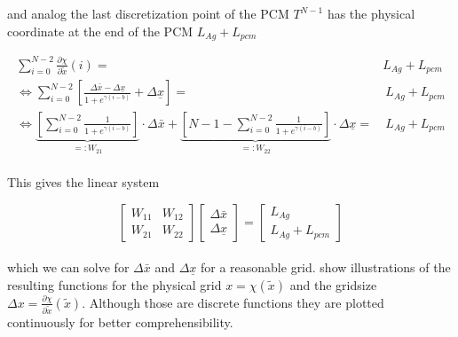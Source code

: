 \documentclass{scrartcl}[12pt, halfparskip]
\numberwithin{equation}{section}
\numberwithin{figure}{section}
\numberwithin{table}{section}
\begin{document}
and analog the last discretization point of the PCM $T^{N-1}$ has the physical coordinate at the end of the PCM $L_{Ag}+L_{pcm}$

\begin{subequations}
	\begin{align}
	\sum_{i=0}^{N - 2} \frac{\partial \chi}{\partial \tilde{x}}(i) = \ & L_{Ag}+L_{pcm} \\
	\Leftrightarrow \sum_{i=0}^{N - 2} \left[ \frac{\Delta \bar{x} - \Delta \underline{x}}{1 + e^{\gamma(i - b)}} + \Delta \underline{x} \right] = & \ L_{Ag}+L_{pcm} \\
	\Leftrightarrow \underbrace{ \left[ \sum_{i=0}^{N - 2} \frac{1}{1 + e^{\gamma(i - b)}} \right] }_{=: W_{21}} \cdot \Delta \bar{x} + \underbrace{ \left[ N - 1 - \sum_{i=0}^{N - 2} \frac{1}{1 + e^{\gamma(i - b)}} \right] }_{=: W_{22}} \cdot \Delta \underline{x} = & \ L_{Ag}+L_{pcm}
	\end{align}
\end{subequations} \\

This gives the linear system

\begin{equation}
	\begin{bmatrix}
		W_{11} & W_{12} \\
		W_{21} & W_{22}
	\end{bmatrix}
	\begin{bmatrix}
		\Delta \bar{x} \\
		\Delta \underline{x}
	\end{bmatrix}
	= 
	\begin{bmatrix}
		L_{Ag} \\
		L_{Ag} + L_{pcm}
	\end{bmatrix}
\end{equation} \\
  
 which we can solve for $\Delta \bar{x}$ and $\Delta \underline{x}$ for a reasonable grid.  show illustrations of the resulting functions for the physical grid $x = \chi(\tilde{x})$ and the gridsize $\Delta x = \frac{\partial \chi}{\partial \tilde{x}}(\tilde{x})$. Although those are discrete functions they are plotted continuously for better comprehensibility. \\
\end{document}
